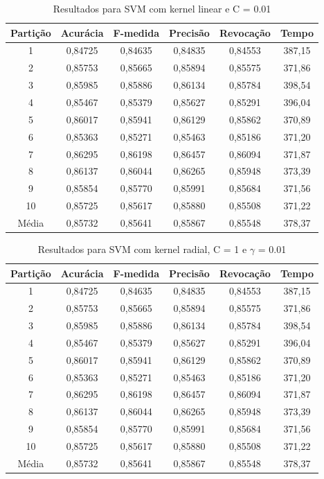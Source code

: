 \begin{table}[h]
\centering
\caption{Resultados para SVM com kernel linear e C = 0.01}
\vspace{0.2cm}
\begin{tabular}{c|c|c|c|c|c}
Partição & Acurácia & F-medida & Precisão & Revocação & Tempo \\
\hline
1  & 0,84725 & 0,84635 & 0,84835 & 0,84553 & 387,15 \\ 
2  & 0,85753 & 0,85665 & 0,85894 & 0,85575 & 371,86 \\
3  & 0,85985 & 0,85886 & 0,86134 & 0,85784 & 398,54 \\
4  & 0,85467 & 0,85379 & 0,85627 & 0,85291 & 396,04 \\
5  & 0,86017 & 0,85941 & 0,86129 & 0,85862 & 370,89 \\
6  & 0,85363 & 0,85271 & 0,85463 & 0,85186 & 371,20 \\
7  & 0,86295 & 0,86198 & 0,86457 & 0,86094 & 371,87 \\
8  & 0,86137 & 0,86044 & 0,86265 & 0,85948 & 373,39 \\
9  & 0,85854 & 0,85770 & 0,85991 & 0,85684 & 371,56 \\
10 & 0,85725 & 0,85617 & 0,85880 & 0,85508 & 371,22 \\
\hline
Média & 0,85732 & 0,85641 & 0,85867 & 0,85548 & 378,37 \\

\end{tabular} 
\label{table:resultadosSVMLinear}
\end{table}

\begin{table}[h]
\centering
\caption{Resultados para SVM com kernel radial, C = 1 e \(\gamma\) = 0.01}
\vspace{0.2cm}
\begin{tabular}{c|c|c|c|c|c}
Partição & Acurácia & F-medida & Precisão & Revocação & Tempo \\
\hline
1  & 0,84725 & 0,84635 & 0,84835 & 0,84553 & 387,15 \\ 
2  & 0,85753 & 0,85665 & 0,85894 & 0,85575 & 371,86 \\
3  & 0,85985 & 0,85886 & 0,86134 & 0,85784 & 398,54 \\
4  & 0,85467 & 0,85379 & 0,85627 & 0,85291 & 396,04 \\
5  & 0,86017 & 0,85941 & 0,86129 & 0,85862 & 370,89 \\
6  & 0,85363 & 0,85271 & 0,85463 & 0,85186 & 371,20 \\
7  & 0,86295 & 0,86198 & 0,86457 & 0,86094 & 371,87 \\
8  & 0,86137 & 0,86044 & 0,86265 & 0,85948 & 373,39 \\
9  & 0,85854 & 0,85770 & 0,85991 & 0,85684 & 371,56 \\
10 & 0,85725 & 0,85617 & 0,85880 & 0,85508 & 371,22 \\
\hline
Média & 0,85732 & 0,85641 & 0,85867 & 0,85548 & 378,37 \\

\end{tabular} 
\label{table:resultadosSVMRadial}
\end{table}

